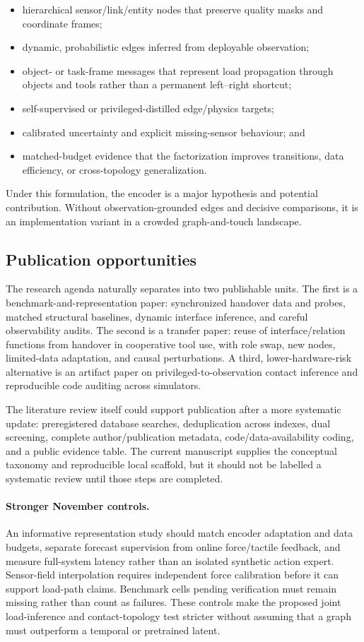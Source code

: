 \begin{itemize}
  \item hierarchical sensor/link/entity nodes that preserve quality masks and
  coordinate frames;
  \item dynamic, probabilistic edges inferred from deployable observation;
  \item object- or task-frame messages that represent load propagation through
  objects and tools rather than a permanent left--right shortcut;
  \item self-supervised or privileged-distilled edge/physics targets;
  \item calibrated uncertainty and explicit missing-sensor behaviour; and
  \item matched-budget evidence that the factorization improves transitions,
  data efficiency, or cross-topology generalization.
\end{itemize}

Under this formulation, the encoder is a major hypothesis and potential
contribution. Without observation-grounded edges and decisive comparisons, it is
an implementation variant in a crowded graph-and-touch landscape.

\subsection{Publication opportunities}

The research agenda naturally separates into two publishable units. The first is
a benchmark-and-representation paper: synchronized handover data and probes,
matched structural baselines, dynamic interface inference, and careful
observability audits. The second is a transfer paper: reuse of interface/relation
functions from handover in cooperative tool use, with role swap, new nodes,
limited-data adaptation, and causal perturbations. A third, lower-hardware-risk
alternative is an artifact paper on privileged-to-observation contact inference
and reproducible code auditing across simulators.

The literature review itself could support publication after a more systematic
update: preregistered database searches, deduplication across indexes, dual
screening, complete author/publication metadata, code/data-availability coding,
and a public evidence table. The current manuscript supplies the conceptual
taxonomy and reproducible local scaffold, but it should not be labelled a
systematic review until those steps are completed.


\paragraph{Stronger November controls.}
An informative representation study should match encoder adaptation and data
budgets, separate forecast supervision from online force/tactile feedback, and
measure full-system latency rather than an isolated synthetic action expert.
Sensor-field interpolation requires independent force calibration before it can
support load-path claims. Benchmark cells pending verification must remain
missing rather than count as failures. These controls make the proposed joint
load-inference and contact-topology test stricter without assuming that a graph
must outperform a temporal or pretrained latent.
